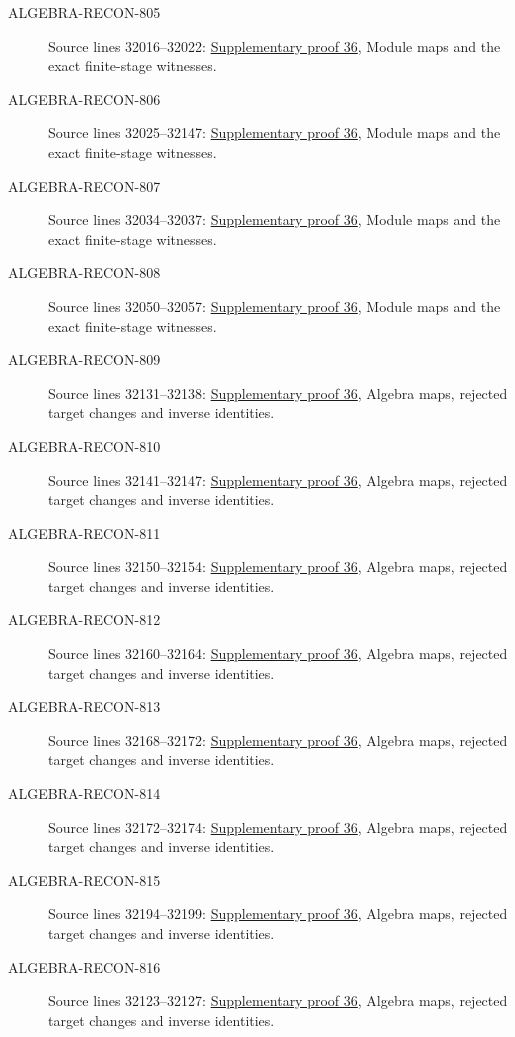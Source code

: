 \begin{description}
\item[ALGEBRA-RECON-805] Source lines 32016--32022: \hyperlink{algebra_colimit_categories_notes_20260928}{Supplementary proof 36}, Module maps and the exact finite-stage witnesses.
\item[ALGEBRA-RECON-806] Source lines 32025--32147: \hyperlink{algebra_colimit_categories_notes_20260928}{Supplementary proof 36}, Module maps and the exact finite-stage witnesses.
\item[ALGEBRA-RECON-807] Source lines 32034--32037: \hyperlink{algebra_colimit_categories_notes_20260928}{Supplementary proof 36}, Module maps and the exact finite-stage witnesses.
\item[ALGEBRA-RECON-808] Source lines 32050--32057: \hyperlink{algebra_colimit_categories_notes_20260928}{Supplementary proof 36}, Module maps and the exact finite-stage witnesses.
\item[ALGEBRA-RECON-809] Source lines 32131--32138: \hyperlink{algebra_colimit_categories_notes_20260928}{Supplementary proof 36}, Algebra maps, rejected target changes and inverse identities.
\item[ALGEBRA-RECON-810] Source lines 32141--32147: \hyperlink{algebra_colimit_categories_notes_20260928}{Supplementary proof 36}, Algebra maps, rejected target changes and inverse identities.
\item[ALGEBRA-RECON-811] Source lines 32150--32154: \hyperlink{algebra_colimit_categories_notes_20260928}{Supplementary proof 36}, Algebra maps, rejected target changes and inverse identities.
\item[ALGEBRA-RECON-812] Source lines 32160--32164: \hyperlink{algebra_colimit_categories_notes_20260928}{Supplementary proof 36}, Algebra maps, rejected target changes and inverse identities.
\item[ALGEBRA-RECON-813] Source lines 32168--32172: \hyperlink{algebra_colimit_categories_notes_20260928}{Supplementary proof 36}, Algebra maps, rejected target changes and inverse identities.
\item[ALGEBRA-RECON-814] Source lines 32172--32174: \hyperlink{algebra_colimit_categories_notes_20260928}{Supplementary proof 36}, Algebra maps, rejected target changes and inverse identities.
\item[ALGEBRA-RECON-815] Source lines 32194--32199: \hyperlink{algebra_colimit_categories_notes_20260928}{Supplementary proof 36}, Algebra maps, rejected target changes and inverse identities.
\item[ALGEBRA-RECON-816] Source lines 32123--32127: \hyperlink{algebra_colimit_categories_notes_20260928}{Supplementary proof 36}, Algebra maps, rejected target changes and inverse identities.

\end{description}
